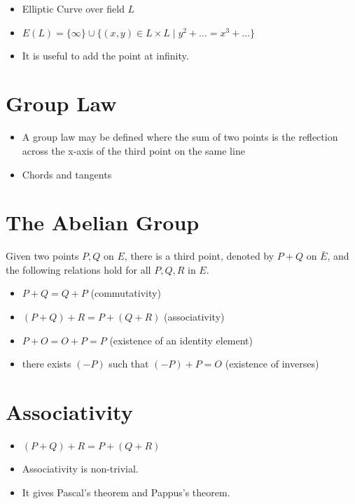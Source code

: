 \begin{itemize}
	\item Elliptic Curve over field \( L \)
	\item \( E(L) = \{\infty\} \cup \{(x, y) \in L \times L \mid y^2 + \ldots = x^3 + \ldots\} \)
	\item It is useful to add the point at infinity.
\end{itemize}

\section*{Group Law}

\begin{itemize}
	\item A group law may be defined where the sum of two points is the reflection across the x-axis of the third point on the same line
	\item Chords and tangents
\end{itemize}

\section*{The Abelian Group}

Given two points \( P, Q \) on \( E \), there is a third point, denoted by \( P+Q \) on \( \bar{E} \), and the following relations hold for all \( P, Q, R \) in \( E \).

\begin{itemize}
	\item \( P + Q = Q + P \) (commutativity)
	\item \( (P + Q) + R = P + (Q + R) \) (associativity)
	\item \( P + O = O + P = P \) (existence of an identity element)
	\item there exists \( (-P) \) such that \( (-P) + P = O \) (existence of inverses)
\end{itemize}

\section*{Associativity}

\begin{itemize}
	\item \( (P+Q)+R = P+(Q+R) \)
	\item Associativity is non-trivial.
	\item It gives Pascal's theorem and Pappus's theorem.
\end{itemize}

